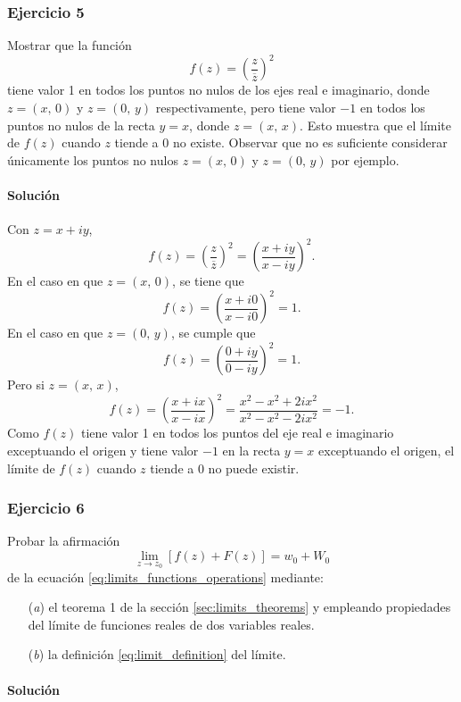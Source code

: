 \documentclass[a4paper]{report}
\begin{document}
\subsubsection{Ejercicio 5}

Mostrar que la función
\[
 f(z)=\left(\frac{z}{\overline{z}}\right)^2
\]
tiene valor 1 en todos los puntos no nulos de los ejes real e imaginario, donde \(z=(x,\,0)\) y \(z=(0,\,y)\) respectivamente, pero tiene valor \(-1\) en todos los puntos no nulos de la recta \(y=x\), donde \(z=(x,\,x)\). Esto muestra que el límite de \(f(z)\) cuando \(z\) tiende a 0 no existe. Observar que no es suficiente considerar únicamente los puntos no nulos \(z=(x,\,0)\) y \(z=(0,\,y)\) por ejemplo.

\paragraph{Solución} Con \(z=x+iy\),
\[
 f(z)=\left(\frac{z}{\overline{z}}\right)^2=\left(\frac{x+iy}{x-iy}\right)^2.
\]
En el caso en que \(z=(x,\,0)\), se tiene que 
\[
 f(z)=\left(\frac{x+i0}{x-i0}\right)^2=1.
\]
En el caso en que \(z=(0,\,y)\), se cumple que 
\[
 f(z)=\left(\frac{0+iy}{0-iy}\right)^2=1.
\]
Pero si \(z=(x,\,x)\),
\[
 f(z)=\left(\frac{x+ix}{x-ix}\right)^2=\frac{x^2-x^2+2ix^2}{x^2-x^2-2ix^2}=-1.
\]
Como \(f(z)\) tiene valor 1 en todos los puntos del eje real e imaginario exceptuando el origen y tiene valor \(-1\) en la recta \(y=x\) exceptuando el origen, el límite de \(f(z)\) cuando \(z\) tiende a 0 no puede existir.

\subsubsection{Ejercicio 6}

Probar la afirmación
\[
 \lim_{z\to z_0}[f(z)+F(z)]=w_0+W_0
\]
de la ecuación \ref{eq:limits_functions_operations} mediante:
\begin{enumerate}
 \item[(\textit{a})] el teorema 1 de la sección \ref{sec:limits_theorems} y empleando propiedades del límite de funciones reales de dos variables reales.
 \item[(\textit{b})] la definición \ref{eq:limit_definition} del límite.
\end{enumerate}

\paragraph{Solución} 
\end{document}
